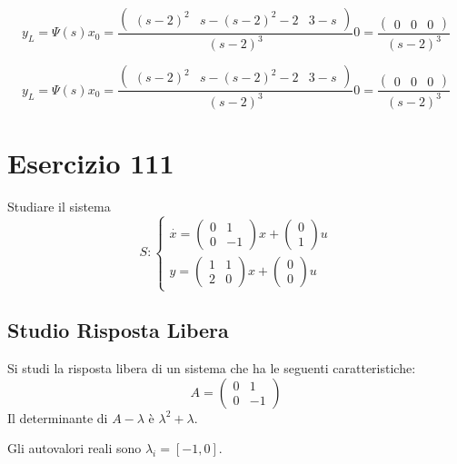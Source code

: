 \documentclass{article}
\begin{document}
\[ y_L = \Psi(s) x_0 = \frac{\left(\begin{matrix}\left(s - 2\right)^{2} & s - \left(s - 2\right)^{2} - 2 & 3 - s\end{matrix}\right)}{\left(s - 2\right)^{3}} 0 = \frac{\left(\begin{matrix}0 & 0 & 0\end{matrix}\right)}{\left(s - 2\right)^{3}} \]

\[ y_L = \Psi(s) x_0 = \frac{\left(\begin{matrix}\left(s - 2\right)^{2} & s - \left(s - 2\right)^{2} - 2 & 3 - s\end{matrix}\right)}{\left(s - 2\right)^{3}} 0 = \frac{\left(\begin{matrix}0 & 0 & 0\end{matrix}\right)}{\left(s - 2\right)^{3}} \]
 
\section{Esercizio 111 }
 Studiare il sistema \[S:\begin{cases}\overset{\cdot}{x} = \left(\begin{matrix}0 & 1\\0 & -1\end{matrix}\right) x+ \left(\begin{matrix}0\\1\end{matrix}\right)u\\y = \left(\begin{matrix}1 & 1\\2 & 0\end{matrix}\right) x +\left(\begin{matrix}0\\0\end{matrix}\right) u\end{cases}\]\subsection{Studio Risposta Libera}
Si studi la risposta libera di un sistema che ha le seguenti caratteristiche: \[A = \left(\begin{matrix}0 & 1\\0 & -1\end{matrix}\right)\]
Il determinante di $A-\lambda$ è $ \lambda^{2} + \lambda $.

Gli autovalori reali sono $\lambda_i = [-1, 0]$.
\end{document}
